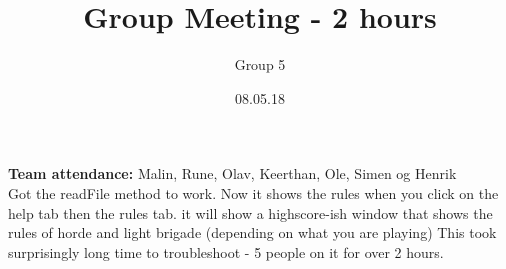 \documentclass{article}
\title{Group Meeting - 2 hours}
\author{Group 5}
\date{08.05.18}
\begin{document}
	\maketitle
	\noindent
	\textbf{Team attendance:}  Malin, Rune, Olav, Keerthan, Ole, Simen og Henrik \\
  \noindent
	Got the readFile method to work. Now it shows the rules when you click on the help tab then the rules tab.
	it will show a highscore-ish window that shows the rules of horde and light brigade (depending on what you are playing)
	This took surprisingly long time to troubleshoot - 5 people on it for over 2 hours. 
\end{document}
